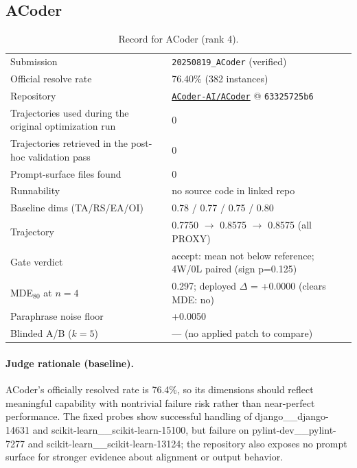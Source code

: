 \subsection{ACoder}
\label{app:agent4}
\begin{table}[h]\centering\scriptsize
\caption{Record for ACoder (rank 4).}
\begin{tabular}{lp{8.2cm}}\toprule
Submission & \texttt{20250819\_\allowbreak{}ACoder} (verified) \\
Official resolve rate & 76.40\% (382 instances) \\
Repository & \href{https://github.com/ACoder-AI/ACoder}{\texttt{ACoder-AI/ACoder}} @ \texttt{63325725b6} \\
Trajectories used during the original optimization run & 0 \\
Trajectories retrieved in the post-hoc validation pass & 0 \\
Prompt-surface files found & 0 \\
Runnability & no source code in linked repo \\
Baseline dims (TA/RS/EA/OI) & 0.78 / 0.77 / 0.75 / 0.80 \\
Trajectory & 0.7750 $\to$ 0.8575 $\to$ 0.8575 (all PROXY) \\
Gate verdict & accept: mean not below reference; 4W/0L paired (sign p=0.125) \\
MDE$_{80}$ at $n{=}4$ & 0.297; deployed $\Delta$ = +0.0000 (clears MDE: no) \\
Paraphrase noise floor & +0.0050 \\
Blinded A/B ($k{=}5$) & --- (no applied patch to compare) \\
\bottomrule\end{tabular}\end{table}
\paragraph{Judge rationale (baseline).}
ACoder's officially resolved rate is 76.4\%, so its dimensions should reflect meaningful capability with nontrivial failure risk rather than near-perfect performance. The fixed probes show successful handling of django\_\_django-14631 and scikit-learn\_\_scikit-learn-15100, but failure on pylint-dev\_\_pylint-7277 and scikit-learn\_\_scikit-learn-13124; the repository also exposes no prompt surface for stronger evidence about alignment or output behavior.
